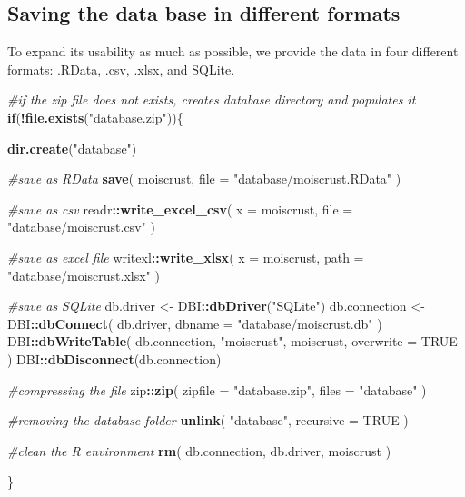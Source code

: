\documentclass[]{article}
\newenvironment{Shaded}{\begin{snugshade}}{\end{snugshade}}
\newcommand{\CommentTok}[1]{\textcolor[rgb]{0.56,0.35,0.01}{\textit{#1}}}
\newcommand{\ControlFlowTok}[1]{\textcolor[rgb]{0.13,0.29,0.53}{\textbf{#1}}}
\newcommand{\DataTypeTok}[1]{\textcolor[rgb]{0.13,0.29,0.53}{#1}}
\newcommand{\KeywordTok}[1]{\textcolor[rgb]{0.13,0.29,0.53}{\textbf{#1}}}
\newcommand{\NormalTok}[1]{#1}
\newcommand{\OperatorTok}[1]{\textcolor[rgb]{0.81,0.36,0.00}{\textbf{#1}}}
\newcommand{\OtherTok}[1]{\textcolor[rgb]{0.56,0.35,0.01}{#1}}
\newcommand{\StringTok}[1]{\textcolor[rgb]{0.31,0.60,0.02}{#1}}
\begin{document}
\hypertarget{saving-the-data-base-in-different-formats}{%
\subsection{Saving the data base in different
formats}\label{saving-the-data-base-in-different-formats}}

To expand its usability as much as possible, we provide the data in four
different formats: .RData, .csv, .xlsx, and SQLite.

\begin{Shaded}
\begin{Highlighting}[]
\CommentTok{#if the zip file does not exists, creates database directory and populates it}
\ControlFlowTok{if}\NormalTok{(}\OperatorTok{!}\KeywordTok{file.exists}\NormalTok{(}\StringTok{"database.zip"}\NormalTok{))\{}
  
  \KeywordTok{dir.create}\NormalTok{(}\StringTok{"database"}\NormalTok{)}
  
  \CommentTok{#save as RData}
  \KeywordTok{save}\NormalTok{(}
\NormalTok{    moiscrust, }
    \DataTypeTok{file =} \StringTok{"database/moiscrust.RData"}
\NormalTok{  )}
  
  \CommentTok{#save as csv}
\NormalTok{  readr}\OperatorTok{::}\KeywordTok{write_excel_csv}\NormalTok{(}
    \DataTypeTok{x =}\NormalTok{ moiscrust,}
    \DataTypeTok{file =} \StringTok{"database/moiscrust.csv"}
\NormalTok{  )}
  
  \CommentTok{#save as excel file}
\NormalTok{  writexl}\OperatorTok{::}\KeywordTok{write_xlsx}\NormalTok{(}
    \DataTypeTok{x =}\NormalTok{ moiscrust,}
    \DataTypeTok{path =} \StringTok{"database/moiscrust.xlsx"}
\NormalTok{  )}
  
  \CommentTok{#save as SQLite}
\NormalTok{  db.driver <-}\StringTok{ }\NormalTok{DBI}\OperatorTok{::}\KeywordTok{dbDriver}\NormalTok{(}\StringTok{"SQLite"}\NormalTok{)}
\NormalTok{  db.connection <-}\StringTok{  }\NormalTok{DBI}\OperatorTok{::}\KeywordTok{dbConnect}\NormalTok{(}
\NormalTok{    db.driver, }
    \DataTypeTok{dbname =} \StringTok{"database/moiscrust.db"}
\NormalTok{    )}
\NormalTok{  DBI}\OperatorTok{::}\KeywordTok{dbWriteTable}\NormalTok{(}
\NormalTok{    db.connection, }
    \StringTok{"moiscrust"}\NormalTok{, }
\NormalTok{    moiscrust, }
    \DataTypeTok{overwrite =} \OtherTok{TRUE}
\NormalTok{    )}
\NormalTok{  DBI}\OperatorTok{::}\KeywordTok{dbDisconnect}\NormalTok{(db.connection)}
  
  \CommentTok{#compressing the file}
\NormalTok{  zip}\OperatorTok{::}\KeywordTok{zip}\NormalTok{(}
    \DataTypeTok{zipfile =} \StringTok{"database.zip"}\NormalTok{,}
    \DataTypeTok{files =} \StringTok{"database"}
\NormalTok{  )}
  
  \CommentTok{#removing the database folder}
  \KeywordTok{unlink}\NormalTok{(}
    \StringTok{"database"}\NormalTok{, }
    \DataTypeTok{recursive =} \OtherTok{TRUE}
\NormalTok{    )}
  
  \CommentTok{#clean the R environment}
  \KeywordTok{rm}\NormalTok{(}
\NormalTok{    db.connection,}
\NormalTok{    db.driver,}
\NormalTok{    moiscrust}
\NormalTok{    )}
  
\NormalTok{\}}
\end{Highlighting}
\end{Shaded}
\end{document}
